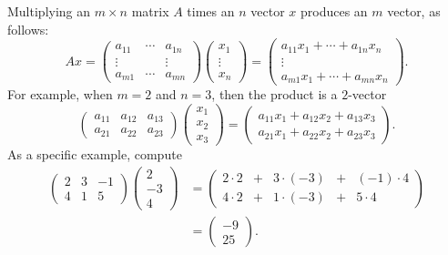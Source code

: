 \documentclass{ximera}
\begin{document}
Multiplying an $m\times n$ matrix $A$ times an $n$ vector $x$
produces an $m$ vector, as follows:
\begin{equation}  \label{Atimesx}
\scriptstyle Ax=\left(
\begin{array}{ccc}
 a_{11}  & \cdots & a_{1n} \\
 \vdots  &        & \vdots  \\
 a_{m1}  & \cdots & a_{mn}
\end{array}
\right)
\left(
\begin{array}{c}
x_1 \\ \vdots \\ x_n
\end{array}
\right)
=
\left(
\begin{array}{c}
a_{11}x_1 + \cdots + a_{1n}x_n \\ \vdots \\
a_{m1}x_1 + \cdots + a_{mn}x_n
\end{array}
\right).
\end{equation}
For example, when $m=2$ and $n=3$, then the product is a $2$-vector
\begin{equation} \label{Atimesx231}
{\scriptstyle
\left(
\begin{array}{ccc}
 a_{11}  & a_{12} & a_{13} \\
 a_{21}  & a_{22} & a_{23}
\end{array}
\right)
\left(
\begin{array}{c}
x_1 \\ x_2 \\ x_3
\end{array}
\right)
=
\left(
\begin{array}{c}
a_{11}x_1 + a_{12}x_2 + a_{13}x_3 \\
a_{21}x_1 + a_{22}x_2 + a_{23}x_3
\end{array}
\right).
}
\end{equation}
As a specific example, compute
\begin{align*}
\left(
\begin{matrix}
 2  & 3 & -1 \\
 4  & 1 &  5
\end{matrix}
\right)
\left(
\begin{matrix}
2 \\ -3 \\ 4
\end{matrix}
\right)
&=
\left(
\begin{matrix}
2\cdot 2 & + & 3\cdot(-3) & + & (-1)\cdot 4 \\
4\cdot 2 & + & 1\cdot(-3) & + & 5\cdot 4
\end{matrix}
\right) \\
&=
\left(
\begin{matrix}
-9 \\ 25
\end{matrix}
\right).
\end{align*}
\end{document}
